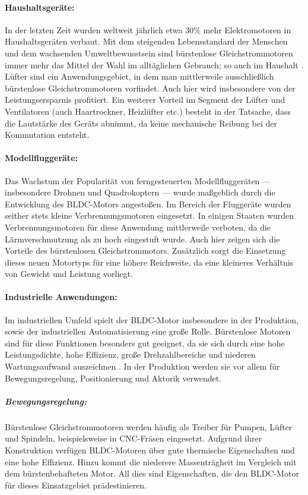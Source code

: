 \paragraph{Haushaltsgeräte:} In der letzten Zeit wurden weltweit jährlich etwa 30\% mehr Elektromotoren in Haushaltsgeräten verbaut. Mit dem steigenden Lebensstandard der Menschen und dem wachsenden Umweltbewusstsein sind bürstenlose Gleichstrommotoren immer mehr das Mittel der Wahl im alltäglichen Gebrauch; so auch im Haushalt \parencite[S.6]{Xia2012}. Lüfter sind ein Anwendungsgebiet, in dem man mittlerweile ausschließlich bürstenlose Gleichstrommotoren vorfindet. Auch hier wird insbesondere von der Leistungsersparnis profitiert. Ein weiterer Vorteil im Segment der Lüfter und Ventilatoren (auch Haartrockner, Heizlüfter etc.) besteht in der Tatsache, dass die Lautstärke des Geräts abnimmt, da keine mechanische Reibung bei der Kommutation entsteht.

\paragraph{Modellfluggeräte:} Das Wachstum der Popularität von ferngesteuerten Modellfluggeräten --- insbesondere Drohnen und Quadrokoptern --- wurde maßgeblich durch die Entwicklung des BLDC-Motors angestoßen. Im Bereich der Fluggeräte wurden seither stets kleine Verbrennungsmotoren eingesetzt. In einigen Staaten wurden Verbrennungsmotoren für diese Anwendung mittlerweile verboten, da die Lärmverschmutzung als zu hoch eingestuft wurde. Auch hier zeigen sich die Vorteile des bürstenlosen Gleichstrommotors. Zusätzlich sorgt die Einsetzung dieses neuen Motortyps für eine höhere Reichweite, da eine kleineres Verhältnis von Gewicht und Leistung vorliegt.

\paragraph{Industrielle Anwendungen:} Im industriellen Umfeld spielt der BLDC-Motor insbesondere in der Produktion, sowie der industriellen Automatisierung eine große Rolle. Bürstenlose Motoren sind für diese Funktionen besonders gut geeignet, da sie sich durch eine hohe Leistungsdichte, hohe Effizienz, große Drehzahlbereiche und niederen Wartungsaufwand auszeichnen \parencite[S.8]{Xia2012}. In der Produktion werden sie vor allem für Bewegungsregelung, Positionierung und Aktorik verwendet.

\subparagraph{Bewegungsregelung:} Bürstenlose Gleichstrommotoren werden häufig als Treiber für Pumpen, Lüfter und Spindeln, beispielsweise in CNC-Fräsen eingesetzt. Aufgrund ihrer Konstruktion verfügen BLDC-Motoren über gute thermische Eigenschaften und eine hohe Effizienz. Hinzu kommt die niederere Massenträgheit im Vergleich mit dem bürstenbehafteten Motor. All dies sind Eigenschaften, die den BLDC-Motor für dieses Einsatzgebiet prädestinieren.

